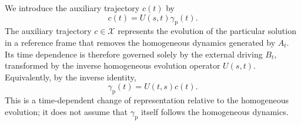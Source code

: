 \documentclass[12pt,a4paper,oneside]{book}
\begin{document}
\begin{example}
\begin{solution}
We introduce the auxiliary trajectory $c(t)$ by
\begin{equation}
    c(t)=U(s,t)\gamma_{\mathrm p}(t).
    \label{eq:variation-substitution}
\end{equation}
The auxiliary trajectory $c\in\mathcal X$ represents the evolution of the particular solution in a reference frame that
removes the homogeneous dynamics generated by $A_t$. Its time dependence is therefore governed solely by the external
driving $B_t$, transformed by the inverse homogeneous evolution operator $U(s,t)$. Equivalently, by the inverse identity,
\begin{equation*}
    \gamma_{\mathrm p}(t)=U(t,s)c(t).
\end{equation*}
This is a time-dependent change of representation relative to the homogeneous evolution; it does not assume that $\gamma_{\mathrm p}$
itself follows the homogeneous dynamics.


\end{solution}
\end{example}
\end{document}
